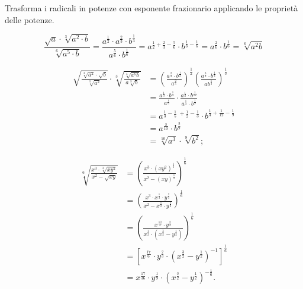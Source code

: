 \begin{exrig}
Trasforma i radicali in potenze con esponente frazionario applicando le 
proprietà delle potenze.
 \begin{esempio}
  \[\dfrac{\sqrt a\cdot \sqrt[3]{a^2\cdot b}}{\sqrt[6]{a^5\cdot b}}=
   \dfrac{a^{\frac 1 2}\cdot a^{\frac 2 3}\cdot 
          b^{\frac 1 3}}{a^{\frac 5 6}\cdot b^{\frac 1 6}}=
   a^{\frac 1 2+\frac 2 3-\frac 5 6}\cdot b^{\frac 1 3-\frac 1 6}=
   a^{\frac 2 6}\cdot b^{\frac 1 6}=\sqrt[6]{a^2b}\]
 \end{esempio}
 \begin{esempio}
 \begin{align*}
 \sqrt{\frac{\sqrt[3]{a^2}\cdot \sqrt b}{\sqrt[5]{a^2}}}\cdot
 \sqrt[3]{\frac{\sqrt[4]{a^6b}}{a\sqrt[3]b}}&=
 \left(\frac{a^{\frac 2 3}\cdot b^{\frac 1 2}}
 {a^{\frac 2 5}}\right)^{\frac 1 2}\left(\frac{a^{\frac 3 2}\cdot 
  b^{\frac 1 4}}{ab^{\frac 1 3}}\right)^{\frac 1 3}\\ &=
  \frac{a^{\frac 1 3}\cdot b^{\frac 1 4}}{a^{\frac 1 5}}\cdot 
  \frac{a^{\frac 1 2}\cdot b^{\frac 1{12}}}{a^{\frac 1 3}\cdot b^{\frac 1 9}}\\
 &=a^{\frac 1 3-\frac 1 5\;+\frac 1 2-\frac 1 3}\cdot 
   b^{\frac 1 4+\frac 1{12}-\frac 1 9}\\
 &=a^{\frac 3{10}}\cdot b^{\frac 2 9}\\
 &=\sqrt[10]{a^3}\cdot \sqrt[9]{b^2};
 \end{align*}
 \end{esempio}
 \begin{esempio}
 \begin{align*}
 \sqrt[6]{\frac{x^3\cdot \sqrt[3]{xy^2}}{x^2-\sqrt{xy}}}&=
 \left(\frac{x^3\cdot (xy^2)^{\frac 1 3}}{x^2-(xy)^{\frac 1 2}}\right)^
   {\frac 1 6}\\
 &=\left(\frac{x^3\cdot x^{\frac 1 3}\cdot y^{\frac 2 3}}
              {x^2-x^{\frac 1 2}\cdot y^{\frac 1 2}}\right)^{\frac 1 6}\\
 &=\left(\frac{x^{\frac{10} 3}\cdot y^{\frac 2 3}}
              {x^{\frac 1 2}\cdot \left(x^{\frac 3 2}-y^{\frac 1 2}\right)}
              \right)^{\frac 1 6}\\
 &=\left[x^{\frac{17} 6}\cdot y^{\frac 2 3}\cdot
   \left(x^{\frac 3 2}-y^{\frac 1 2}\right)^{-1}\right]^{\frac 1 6}\\
 &=x^{\frac{17}{36}}\cdot y^{\frac 1 9}\cdot 
      \left(x^{\frac 3 2}-y^{\frac 1 2}\right)^{-\frac 1 6}.
 \end{align*}
 \end{esempio}
\end{exrig}

